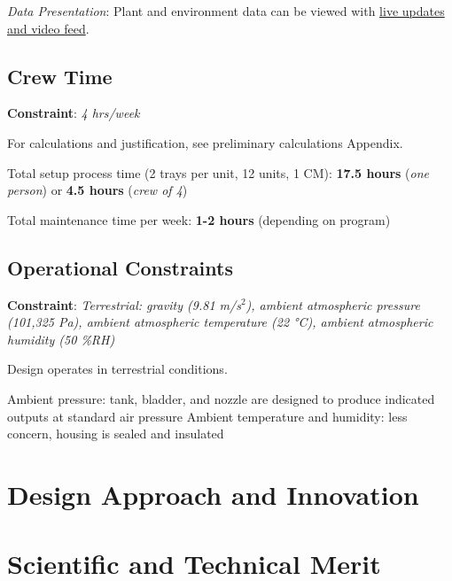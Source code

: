 \documentclass{../tex/report}
\begin{document}
\textit{Data Presentation}: Plant and environment data can be viewed with \uline{live updates and video feed}.

\subsection{Crew Time}

\textbf{Constraint}: \textit{4 hrs/week}

For calculations and justification, see preliminary calculations Appendix.

Total setup process time (2 trays per unit, 12 units, 1 CM): \textbf{17.5 hours} (\textit{one person}) or \textbf{4.5 hours} (\textit{crew of 4})

Total maintenance time per week: \textbf{1-2 hours} (depending on program)

\subsection{Operational Constraints} 

\textbf{Constraint}: \textit{Terrestrial: gravity (9.81 m/s${}^2$), ambient atmospheric pressure (101,325 Pa), ambient atmospheric temperature (22 °C), ambient atmospheric humidity (50 \%RH)}

Design operates in terrestrial conditions.

Ambient pressure: tank, bladder, and nozzle are designed to produce indicated outputs at standard air pressure
Ambient temperature and humidity: less concern, housing is sealed and insulated

\section{Design Approach and Innovation}

\section{Scientific and Technical Merit}
\end{document}
